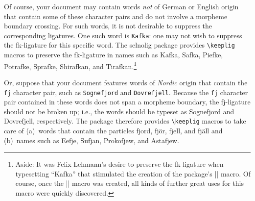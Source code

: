 \documentclass[11pt]{article}
\newcommand{\pkg}[1]{\textsf{#1}}
\newcommand{\opt}[1]{\texttt{#1}}
\newcommand{\cmmd}[1]{\texttt{\textbackslash #1}}
\begin{document}
Of course, your document may contain words \emph{not} of German or English origin that contain some of these character pairs and do not involve a morpheme boundary crossing. For such words, it is not desirable to suppress the corresponding ligatures. One such word is \opt{Kafka}: one may not wish to suppress the \mbox{fk}-ligature for this specific word. The \pkg{selnolig} package provides \cmmd{keeplig} macros to preserve the \mbox{fk}-ligature in names such as Kafka, Safka, Piefke, Potrafke, Sprafke, Shirafkan, and Tirafkan.\footnote{Aside: It was Felix Lehmann's desire to preserve the \mbox{fk} ligature when typesetting \enquote{Kafka} that stimulated the creation of the package's |\keeplig| macro. Of course, once the |\keeplig| macro was created, all kinds of further great uses for this macro were quickly discovered.} 

Or, suppose that your document features words of \emph{Nordic} origin that contain the \opt{fj} character pair, such as \opt{Sognefjord} and \opt{Dovrefjell}. Because the \opt{fj} character pair contained in these words does not span a morpheme boundary, the \mbox{fj}-ligature should not be broken up; i.e., the words should be typeset as Sognefjord and Dovrefjell, respectively. The package therefore provides \cmmd{keeplig} macros to take care of (a)~words that contain the particles fjord, fjör, fjell, and fjäll and (b)~names such as Eefje, Sufjan, Prokofjew, and Astafjew.
\end{document}
